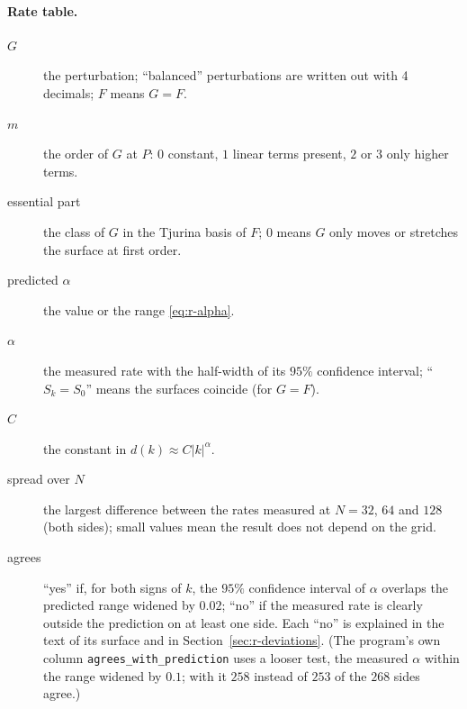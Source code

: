 \documentclass[12pt, a4paper]{article}
\theoremstyle{plain}
\theoremstyle{definition}
\theoremstyle{remark}
\theoremstyle{definition}
\begin{document}
\paragraph{Rate table.}
\begin{description}
    \item[$G$] the perturbation; ``balanced'' perturbations are written out with
          4 decimals; $F$ means $G=F$.
    \item[$m$] the order of $G$ at $P$: $0$ constant, $1$ linear terms present,
          $2$ or $3$ only higher terms.
    \item[essential part] the class of $G$ in the Tjurina basis of $F$; $0$ means $G$
          only moves or stretches the surface at first order.
    \item[predicted $\alpha$] the value or the range \eqref{eq:r-alpha}.
    \item[$\alpha$] the measured rate with the half-width of its $95\%$ confidence
          interval; ``$S_k=S_0$'' means the surfaces coincide (for $G=F$).
    \item[$C$] the constant in $d(k)\approx C|k|^\alpha$.
    \item[spread over $N$] the largest difference between the rates measured at
          $N=32$, $64$ and $128$ (both sides); small values mean the result does not
          depend on the grid.
    \item[agrees] ``yes'' if, for both signs of $k$, the $95\%$ confidence interval
          of $\alpha$ overlaps the predicted range widened by $0.02$; ``no'' if the
          measured rate is clearly outside the prediction on at least one side. Each
          ``no'' is explained in the text of its surface and in
          Section~\ref{sec:r-deviations}. (The program's own column
          \texttt{agrees\_with\_prediction} uses a looser test, the measured
          $\alpha$ within the range widened by $0.1$; with it $258$ instead of $253$
          of the $268$ sides agree.)
\end{description}
\end{document}
